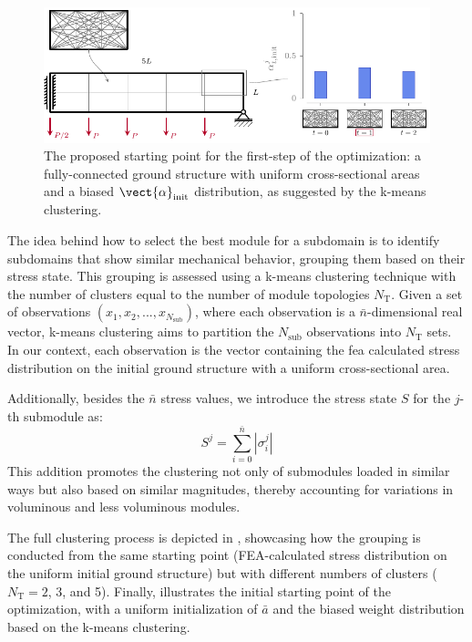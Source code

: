 \begin{figure}
    \centering
    \includegraphics{figures/06_DMO/00_x0/x0.pdf}
    \caption{The proposed starting point for the first-step of the optimization: a fully-connected ground structure with uniform cross-sectional areas and a biased $\vect{\alpha}_\text{init}$ distribution, as suggested by the k-means clustering.}
    \label{fig:06_x0}
\end{figure}

The idea behind how to select the best module for a subdomain is to identify subdomains that show similar mechanical behavior, grouping them based on their stress state. This grouping is assessed using a k-means clustering technique with the number of clusters equal to the number of module topologies $N_\text{T}$. Given a set of observations $(x_1, x_2, ..., x_{N_\text{sub}})$, where each observation is a $\bar{n}$-dimensional real vector, k-means clustering aims to partition the $N_\text{sub}$ observations into $N_\text{T}$ sets. In our context, each observation is the vector containing the \acrfull{fea} calculated stress distribution on the initial ground structure with a uniform cross-sectional area.

Additionally, besides the $\bar{n}$ stress values, we introduce the stress state $S$ for the $j$-th submodule as:
\begin{equation}
    S^j = \sum_{i=0}^{\bar{n}}|\sigma_i^j|
\end{equation}
This addition promotes the clustering not only of submodules loaded in similar ways but also based on similar magnitudes, thereby accounting for variations in voluminous and less voluminous modules.

The full clustering process is depicted in , showcasing how the grouping is conducted from the same starting point (FEA-calculated stress distribution on the uniform initial ground structure) but with different numbers of clusters ($N_\text{T}=2$, 3, and 5). Finally,  illustrates the initial starting point of the optimization, with a uniform initialization of $\bar{a}$ and the biased weight distribution based on the k-means clustering.

